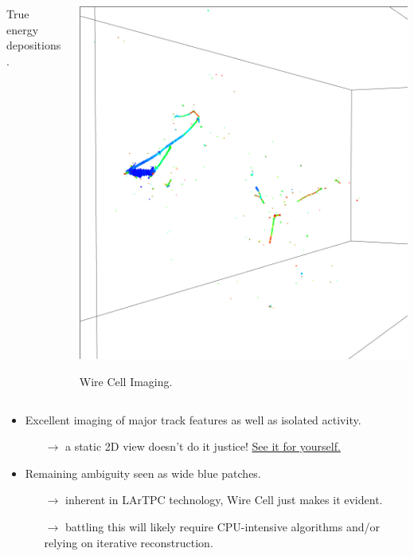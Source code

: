 \documentclass[xcolor=dvipsnames]{beamer}
\begin{document}
\begin{frame}[fragile]
\begin{columns}
\begin{column}{0.5\textwidth}
\begin{center}
        True energy depositions.
      \end{center}
    \end{column}
    \begin{column}{0.5\textwidth}
      \begin{center}
        \includegraphics[width=\textwidth,trim=3cm 10cm 3cm 10cm,clip]{payoff-reco.png}

        Wire Cell Imaging.
      \end{center}
    \end{column}
  \end{columns}

  \vfill

  \footnotesize
  \begin{itemize}
  \item Excellent imaging of major track features as well as isolated
    activity.
    \begin{itemize}\scriptsize
    \item[$\rightarrow$] a static 2D view doesn't do it justice!  \href{http://www.phy.bnl.gov/wire-cell/bee/set/6/event/0/}{See it for yourself.}
    \end{itemize}
  \item Remaining ambiguity seen as wide blue patches.
    \begin{itemize}\scriptsize
    \item[$\rightarrow$] inherent in LArTPC technology, Wire Cell just makes it evident.
    \item[$\rightarrow$] battling this will likely require CPU-intensive algorithms and/or relying on iterative reconstruction.
    \end{itemize}
  \end{itemize}
\end{frame}
\end{document}
